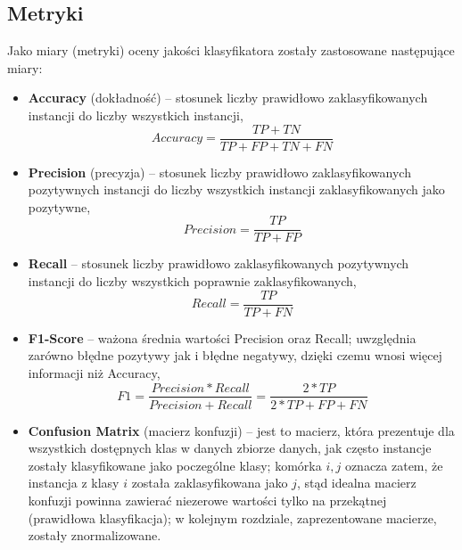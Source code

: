     \pagebreak
    \subsection{Metryki}
    Jako miary (metryki) oceny jakości klasyfikatora zostały zastosowane następujące miary:
    \begin{itemize}
        \item{\textbf{Accuracy} (dokładność) -- stosunek liczby prawidłowo zaklasyfikowanych instancji
                                                do liczby wszystkich instancji,}
            $$ Accuracy = \frac{TP + TN}{TP + FP + TN + FN} $$

        \item{\textbf{Precision} (precyzja) -- stosunek liczby prawidłowo zaklasyfikowanych pozytywnych
                                               instancji do liczby wszystkich instancji zaklasyfikowanych jako pozytywne,}
           $$ Precision = \frac{TP}{TP + FP} $$

        \item{\textbf{Recall} -- stosunek liczby prawidłowo zaklasyfikowanych pozytywnych
                               instancji do liczby wszystkich poprawnie zaklasyfikowanych,}
           $$ Recall = \frac{TP}{TP + FN} $$

        \item{\textbf{F1-Score} -- ważona średnia wartości Precision oraz Recall; uwzględnia zarówno błędne pozytywy
                                   jak i błędne negatywy, dzięki czemu wnosi więcej informacji niż Accuracy,}
           $$ F1 = \frac{Precision * Recall}{Precision + Recall} = \frac{2 * TP}{2 * TP + FP + FN} $$

        \item{\textbf{Confusion Matrix} (macierz konfuzji) -- jest to macierz, która prezentuje dla wszystkich dostępnych
                                                            klas w danych zbiorze danych, jak często instancje zostały klasyfikowane
                                                            jako poczególne klasy; komórka $i, j$ oznacza zatem, że instancja z klasy $i$
                                                            została zaklasyfikowana jako $j$, stąd idealna macierz konfuzji powinna zawierać
                                                            niezerowe wartości tylko na przekątnej (prawidłowa klasyfikacja); w kolejnym
                                                            rozdziale, zaprezentowane macierze, zostały znormalizowane.}
    \end{itemize}

